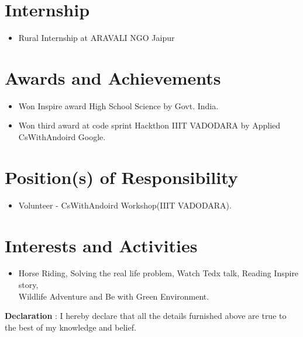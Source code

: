 \documentclass{article}
\begin{document}
\section{Internship}
\begin{itemize}
\item Rural Internship at ARAVALI NGO Jaipur  
\end{itemize}



\section{Awards and Achievements}
\begin{itemize}
\item Won Inspire award High School Science by Govt. India.
\item Won third award at code sprint Hackthon IIIT VADODARA by Applied CsWithAndoird Google.
 
\end{itemize}


\section{Position(s) of Responsibility}

\begin{itemize}
\item Volunteer - CsWithAndoird Workshop(IIIT VADODARA). 
\end{itemize}

\section{Interests and Activities}
\begin{itemize}
\item[] Horse Riding, Solving the real life problem,  Watch Tedx talk, Reading Inspire story, \\Wildlife Adventure and Be with Green Environment.\end{itemize}

\textbf{Declaration} : I hereby declare that all the details furnished above are true to the best of my knowledge and belief.
\end{document}
